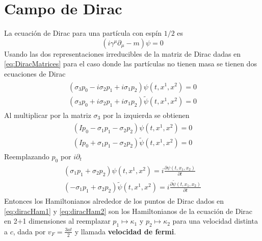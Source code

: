 \section{Campo de Dirac}
La ecuación de Dirac para una partícula con espín $1/2$ es
\begin{equation}
	(i\gamma^\mu\partial_\mu -m)\psi = 0
\end{equation}
Usando las dos representaciones irreducibles de la matriz de Dirac dadas en \eqref{eq:DiracMatrices} para el caso donde las partículas no tienen masa se tienen dos ecuaciones de Dirac
\begin{align}
	\begin{split}
		(\sigma_3 p_0 - i\sigma_2 p_1 + i\sigma_1 p_2)\psi(t,x^1,x^2) = 0 \\
		(\sigma_3 p_0 + i\sigma_2 p_1 + i\sigma_1 p_2) \widetilde{\psi}(t,x^1,x^2) = 0
	\end{split}
\end{align}
Al multiplicar por la matriz $\sigma_3$ por la izquierda se obtienen
\begin{align}
	\begin{split}
		(I p_0 - \sigma_1 p_1 - \sigma_2 p_2)\psi(t,x^1,x^2) = 0 \\
		(I p_0 + \sigma_1 p_1 - \sigma_2 p_2) \widetilde{\psi}(t,x^1,x^2) = 0
	\end{split}
\end{align}
Reemplazando $p_0$ por $i\partial_t$
\begin{align}
	\begin{split}
		(\sigma_1 p_1 + \sigma_2 p_2)\psi(t,x^1,x^2) = i\frac{\partial \psi(t,x_1,x_2)}{\partial t} \\
		(-\sigma_1 p_1 + \sigma_2 p_2) \widetilde{\psi}(t,x^1,x^2) = i\frac{\partial \widetilde{\psi}(t,x_1,x_2)}{\partial t}
	\end{split}
\end{align}
Entonces los Hamiltonianos alrededor de los puntos de Dirac dados en \eqref{eq:diracHam1} y \eqref{eq:diracHam2} son los Hamiltonianos de la ecuación de Dirac en 2+1 dimensiones al reemplazar $p_1\mapsto\kappa_1$ y $p_2\mapsto\kappa_2$ para una velocidad distinta a $c$, dada por $v_F = \frac{3at}{2}$ y llamada \textbf{velocidad de fermi}.\par
